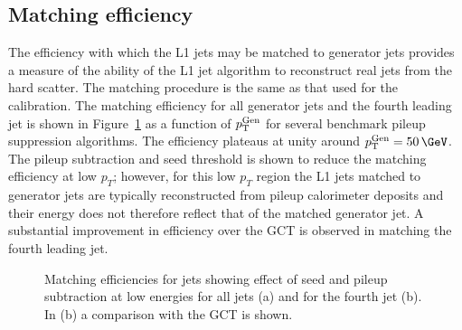 \subsection{Matching efficiency}

The efficiency with which the L1 jets may be matched to generator jets provides a measure of the ability of the L1 jet algorithm 
to reconstruct real jets from the hard scatter. The matching procedure is the same as that used for the calibration. 
The matching efficiency for all generator jets and the fourth leading jet is shown 
in Figure~\ref{fig:match} as a function of ${p_{\text T}^{\text{Gen}}}$ for several benchmark pileup suppression algorithms. 
The efficiency plateaus at unity around $\Genpt=50\,\GeV$. The pileup subtraction and seed threshold is shown to reduce
the matching efficiency at low $p_T$; however, for this low $p_T$ region the L1 jets matched to generator jets are typically
reconstructed from pileup calorimeter deposits and their energy does not therefore
reflect that of the matched generator jet. A substantial improvement in efficiency over the GCT is observed in 
matching the fourth leading jet.





\begin{figure}
\begin{center}
\caption{Matching efficiencies for jets showing effect of seed and pileup subtraction at low energies for all jets (a) and for the fourth jet (b). In (b)
a comparison with the GCT is shown.}
\label{fig:match}
\end{center}
\end{figure}

